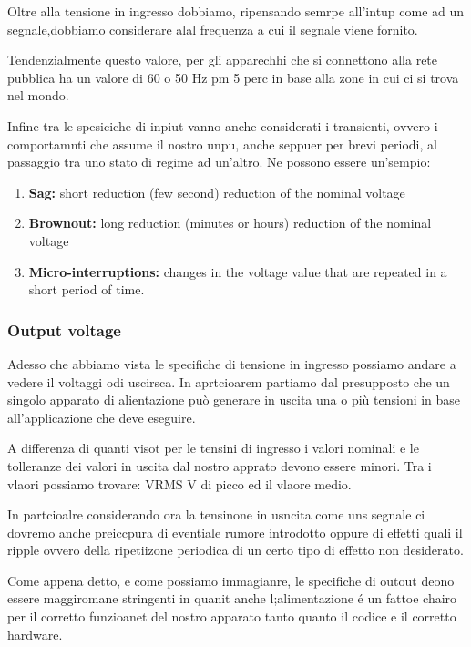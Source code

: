 \documentclass[../main.tex]{subfiles}
\begin{document}
Oltre alla tensione in ingresso dobbiamo, ripensando semrpe all'intup come ad un segnale,dobbiamo considerare alal frequenza a cui il segnale viene fornito.

Tendenzialmente questo valore, per gli apparechhi che si connettono alla rete pubblica ha un valore di 60 o 50 Hz pm 5 perc in base alla zone in cui ci si trova nel mondo.

Infine tra le spesiciche di inpiut vanno anche considerati i transienti, ovvero i comportamnti che assume il nostro unpu, anche seppuer per brevi periodi, al passaggio tra uno stato di regime ad un'altro. Ne possono essere un'sempio:

\begin{enumerate}
	\item[\textbf{-}] \textbf{Sag:} short reduction (few second) reduction of the nominal voltage
	\item[\textbf{-}] \textbf{Brownout:} long reduction (minutes or hours) reduction of the nominal voltage
	\item[\textbf{-}] \textbf{Micro-interruptions:} changes in the voltage value that are repeated in a short period of time.
\end{enumerate}

\subsubsection*{Output voltage}

Adesso che abbiamo vista le specifiche di tensione in ingresso possiamo andare a vedere il voltaggi odi uscirsca. In aprtcioarem partiamo dal presupposto che un singolo apparato di alientazione può generare in uscita una o più tensioni in base all'applicazione che deve eseguire.

A differenza di quanti visot per le tensini di ingresso i valori nominali e le tolleranze dei valori in uscita dal nostro apprato devono essere minori. Tra i vlaori possiamo trovare: VRMS V di picco ed il vlaore medio.

In partcioalre considerando ora la tensinone in usncita come uns segnale ci dovremo anche preiccpura di eventiale rumore introdotto oppure di effetti quali il ripple ovvero della ripetiizone periodica di un certo tipo di effetto non desiderato. 

Come appena detto, e come possiamo immagianre, le specifiche di outout deono essere maggiromane stringenti in quanit anche l;alimentazione é un fattoe chairo per il corretto funzioanet del nostro apparato tanto quanto il codice e il corretto hardware. 
\end{document}
